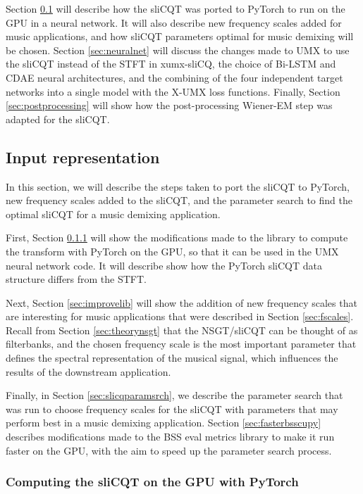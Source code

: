 \documentclass[report.tex]{subfiles}
\begin{document}
Section \ref{sec:inputrepresentation} will describe how the sliCQT was ported to PyTorch to run on the GPU in a neural network. It will also describe new frequency scales added for music applications, and how sliCQT parameters optimal for music demixing will be chosen. Section \ref{sec:neuralnet} will discuss the changes made to UMX to use the sliCQT instead of the STFT in xumx-sliCQ, the choice of Bi-LSTM and CDAE neural architectures, and the combining of the four independent target networks into a single model with the X-UMX loss functions. Finally, Section \ref{sec:postprocessing} will show how the post-processing Wiener-EM step was adapted for the sliCQT.

\subsection{Input representation}
\label{sec:inputrepresentation}

In this section, we will describe the steps taken to port the sliCQT to PyTorch, new frequency scales added to the sliCQT, and the parameter search to find the optimal sliCQT for a music demixing application.

First, Section \ref{sec:torchslicq} will show the modifications made to the library to compute the transform with PyTorch on the GPU, so that it can be used in the UMX neural network code. It will describe show how the PyTorch sliCQT data structure differs from the STFT.

Next, Section \ref{sec:improvelib} will show the addition of new frequency scales that are interesting for music applications that were described in Section \ref{sec:fscales}. Recall from Section \ref{sec:theorynsgt} that the NSGT/sliCQT can be thought of as filterbanks, and the chosen frequency scale is the most important parameter that defines the spectral representation of the musical signal, which influences the results of the downstream application.

Finally, in Section \ref{sec:slicqparamsrch}, we describe the parameter search that was run to choose frequency scales for the sliCQT with parameters that may perform best in a music demixing application. Section \ref{sec:fasterbsscupy} describes modifications made to the BSS eval metrics library to make it run faster on the GPU, with the aim to speed up the parameter search process.

\subsubsection{Computing the sliCQT on the GPU with PyTorch}
\label{sec:torchslicq}
\end{document}
